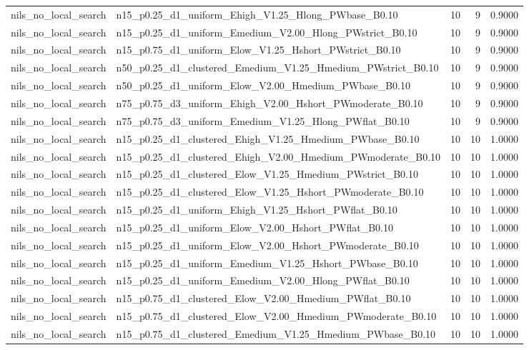 \begin{tabular}{llrrr}
nils_no_local_search & n15_p0.25_d1_uniform_Ehigh_V1.25_Hlong_PWbase_B0.10 & 10 & 9 & 0.9000 \\
nils_no_local_search & n15_p0.25_d1_uniform_Emedium_V2.00_Hlong_PWstrict_B0.10 & 10 & 9 & 0.9000 \\
nils_no_local_search & n15_p0.75_d1_uniform_Elow_V1.25_Hshort_PWstrict_B0.10 & 10 & 9 & 0.9000 \\
nils_no_local_search & n50_p0.25_d1_clustered_Emedium_V1.25_Hmedium_PWstrict_B0.10 & 10 & 9 & 0.9000 \\
nils_no_local_search & n50_p0.25_d1_uniform_Elow_V2.00_Hmedium_PWbase_B0.10 & 10 & 9 & 0.9000 \\
nils_no_local_search & n75_p0.75_d3_uniform_Ehigh_V2.00_Hshort_PWmoderate_B0.10 & 10 & 9 & 0.9000 \\
nils_no_local_search & n75_p0.75_d3_uniform_Emedium_V1.25_Hlong_PWflat_B0.10 & 10 & 9 & 0.9000 \\
nils_no_local_search & n15_p0.25_d1_clustered_Ehigh_V1.25_Hmedium_PWbase_B0.10 & 10 & 10 & 1.0000 \\
nils_no_local_search & n15_p0.25_d1_clustered_Ehigh_V2.00_Hmedium_PWmoderate_B0.10 & 10 & 10 & 1.0000 \\
nils_no_local_search & n15_p0.25_d1_clustered_Elow_V1.25_Hmedium_PWstrict_B0.10 & 10 & 10 & 1.0000 \\
nils_no_local_search & n15_p0.25_d1_clustered_Elow_V1.25_Hshort_PWmoderate_B0.10 & 10 & 10 & 1.0000 \\
nils_no_local_search & n15_p0.25_d1_uniform_Ehigh_V1.25_Hshort_PWflat_B0.10 & 10 & 10 & 1.0000 \\
nils_no_local_search & n15_p0.25_d1_uniform_Elow_V2.00_Hshort_PWflat_B0.10 & 10 & 10 & 1.0000 \\
nils_no_local_search & n15_p0.25_d1_uniform_Elow_V2.00_Hshort_PWmoderate_B0.10 & 10 & 10 & 1.0000 \\
nils_no_local_search & n15_p0.25_d1_uniform_Emedium_V1.25_Hshort_PWbase_B0.10 & 10 & 10 & 1.0000 \\
nils_no_local_search & n15_p0.25_d1_uniform_Emedium_V2.00_Hlong_PWflat_B0.10 & 10 & 10 & 1.0000 \\
nils_no_local_search & n15_p0.75_d1_clustered_Elow_V2.00_Hmedium_PWflat_B0.10 & 10 & 10 & 1.0000 \\
nils_no_local_search & n15_p0.75_d1_clustered_Elow_V2.00_Hmedium_PWmoderate_B0.10 & 10 & 10 & 1.0000 \\
nils_no_local_search & n15_p0.75_d1_clustered_Emedium_V1.25_Hmedium_PWbase_B0.10 & 10 & 10 & 1.0000 \\

\end{tabular}
